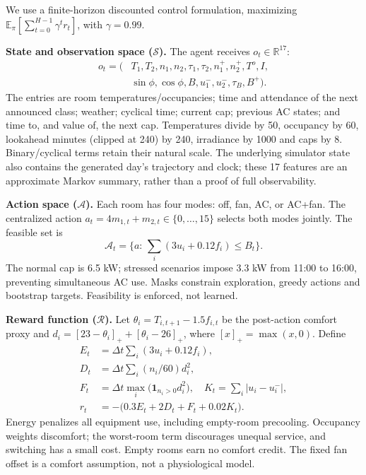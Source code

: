 \documentclass[10pt,a4paper]{article}
\newcommand{\sect}[1]{\vspace{5pt}\noindent{\large\bfseries #1}\par\vspace{1pt}}
\newcommand{\subhead}[1]{\noindent\textbf{#1}}
\newcommand{\R}{\mathbb{R}}
\begin{document}
\sect{2. RL formulation}
We use a finite-horizon discounted control formulation, maximizing
$\mathbb{E}_{\pi}[\sum_{t=0}^{H-1}\gamma^t r_t]$, with $\gamma=0.99$.

\subhead{State and observation space ($\mathcal S$).}
The agent receives $o_t\in\R^{17}$:
\begin{align*}
o_t=(&T_1,T_2,n_1,n_2,\tau_1,\tau_2,n_1^+,n_2^+,T^o,I,\\
&\sin\phi,\cos\phi,B,u_1^-,u_2^-,\tau_B,B^+).
\end{align*}
The entries are room temperatures/occupancies; time and attendance of the next
announced class; weather; cyclical time; current cap; previous AC states; and time
to, and value of, the next cap. Temperatures divide by 50, occupancy by 60,
lookahead minutes (clipped at 240) by 240, irradiance by 1000 and caps by 8.
Binary/cyclical terms retain their natural scale. The underlying simulator state
also contains the generated day's trajectory and clock; these 17 features are
an approximate Markov summary, rather than a proof of full observability.

\subhead{Action space ($\mathcal A$).}
Each room has four modes: off, fan, AC, or AC+fan. The centralized action
$a_t=4m_{1,t}+m_{2,t}\in\{0,\ldots,15\}$ selects both modes jointly. The feasible
set is
\[
\mathcal A_t=\{a:\,\textstyle\sum_i(3u_i+0.12f_i)\le B_t\}.
\]
The normal cap is 6.5 kW; stressed scenarios impose 3.3 kW from 11:00 to 16:00,
preventing simultaneous AC use. Masks constrain exploration, greedy actions and
bootstrap targets. Feasibility is enforced, not learned.

\subhead{Reward function ($\mathcal R$).}
Let $\theta_i=T_{i,t+1}-1.5f_{i,t}$ be the post-action comfort proxy and
$d_i=[23-\theta_i]_+ +[\theta_i-26]_+$, where $[x]_+=\max(x,0)$. Define
\begin{align*}
E_t&=\Delta t\textstyle\sum_i(3u_i+0.12f_i),\\[-2pt]
D_t&=\Delta t\textstyle\sum_i(n_i/60)d_i^2,\\[-2pt]
F_t&=\Delta t\max_i\big(\mathbf1_{n_i>0}d_i^2\big),\quad
K_t=\textstyle\sum_i|u_i-u_i^-|,\\[-2pt]
r_t&=-\big(0.3E_t+2D_t+F_t+0.02K_t\big).
\end{align*}
Energy penalizes all equipment use, including empty-room precooling. Occupancy
weights discomfort; the worst-room term discourages unequal service, and switching
has a small cost. Empty rooms earn no comfort credit. The fixed fan offset is a
comfort assumption, not a physiological model.
\end{document}
